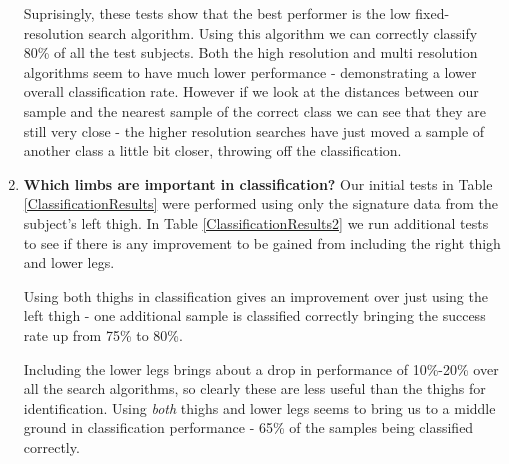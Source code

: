 \begin{enumerate}
		Suprisingly, these tests show that the best performer is the low fixed-resolution search algorithm.
		Using this algorithm we can correctly classify 80\% of all the test subjects.
		Both the high resolution and multi resolution algorithms seem to have much lower performance - demonstrating a lower overall classification rate.
		However if we look at the distances between our sample and the nearest sample of the correct class we can see that they are still very close - the higher resolution searches
		have just moved a sample of another class a little bit closer, throwing off the classification.
		
	\item \textbf{Which limbs are important in classification?}
		Our initial tests in Table \ref{ClassificationResults} were performed using only the signature data from the subject's left thigh.
		In Table \ref{ClassificationResults2} we run additional tests to see if there is any improvement to be gained from including the right thigh and lower legs.
		
		Using both thighs in classification gives an improvement over just using the left thigh - one additional sample is classified correctly bringing the success rate up from 75\% to 80\%.
		
		Including the lower legs brings about a drop in performance of 10\%-20\% over all the search algorithms, so clearly these are less useful than the thighs for identification.
		Using \emph{both} thighs and lower legs seems to bring us to a middle ground in classification performance - 65\% of the samples being classified correctly.
\end{enumerate}

